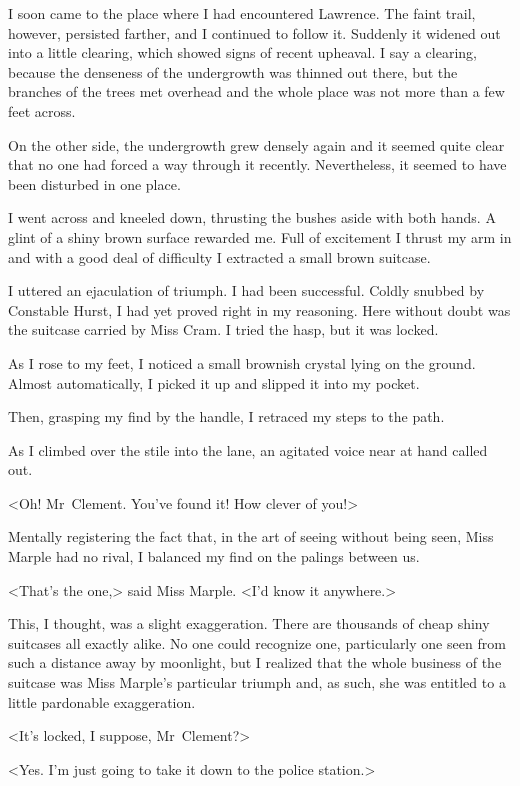 I soon came to the place where I had encountered Lawrence. The faint trail, however, persisted farther, and I continued to follow it. Suddenly it widened out into a little clearing, which showed signs of recent upheaval. I say a clearing, because the denseness of the undergrowth was thinned out there, but the branches of the trees met overhead and the whole place was not more than a few feet across.

On the other side, the undergrowth grew densely again and it seemed quite clear that no one had forced a way through it recently. Nevertheless, it seemed to have been disturbed in one place.

I went across and kneeled down, thrusting the bushes aside with both hands. A glint of a shiny brown surface rewarded me. Full of excitement I thrust my arm in and with a good deal of difficulty I extracted a small brown suitcase.

I uttered an ejaculation of triumph. I had been successful. Coldly snubbed by Constable Hurst, I had yet proved right in my reasoning. Here without doubt was the suitcase carried by Miss Cram. I tried the hasp, but it was locked.

As I rose to my feet, I noticed a small brownish crystal lying on the ground. Almost automatically, I picked it up and slipped it into my pocket.

Then, grasping my find by the handle, I retraced my steps to the path.

As I climbed over the stile into the lane, an agitated voice near at hand called out.

<Oh! Mr~Clement. You've found it! How clever of you!>

Mentally registering the fact that, in the art of seeing without being seen, Miss Marple had no rival, I balanced my find on the palings between us.

<That's the one,> said Miss Marple. <I'd know it anywhere.>

This, I thought, was a slight exaggeration. There are thousands of cheap shiny suitcases all exactly alike. No one could recognize one, particularly one seen from such a distance away by moonlight, but I realized that the whole business of the suitcase was Miss Marple's particular triumph and, as such, she was entitled to a little pardonable exaggeration.

<It's locked, I suppose, Mr~Clement?>

<Yes. I'm just going to take it down to the police station.>

